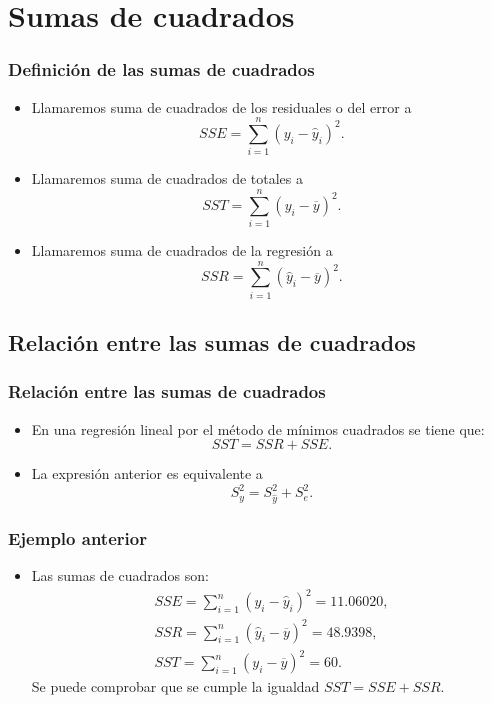 \section{Sumas de cuadrados}
\begin{frame}
\frametitle{Definición de las sumas de cuadrados}

\begin{itemize}
\item<2->{Llamaremos suma de cuadrados de los residuales o del error a
$$SSE=\sum_{i=1}^n(y_i-\hat{y}_i)^2.$$ }
\item<3->{Llamaremos suma de
cuadrados de totales a $$SST =\sum_{i=1}^n(y_i-\overline{y})^2.$$}
\item<4->{Llamaremos suma de cuadrados de la regresión a
$$SSR=\sum_{i=1}^n(\hat{y}_i-\overline{y})^2.$$}
\end{itemize}
\end{frame}

\subsection{Relación entre las sumas de cuadrados}
\begin{frame}
\frametitle{Relación entre las sumas de cuadrados}

\begin{itemize}
\item<2->{En una regresión lineal por el método de mínimos cuadrados se tiene que:
$$SST=SSR+SSE.$$}
\item<3->{La expresión anterior es equivalente a
$$S^2_y=S^2_{\hat{y}}+S^2_e.$$}
\end{itemize}
\end{frame}

\begin{frame}
\frametitle{Ejemplo anterior}
\begin{itemize}
\item<2->{Las sumas de cuadrados son:
$$
\begin{array}{l}
SSE=\sum_{i=1}^n(y_i-\hat{y}_i)^2 =11.06020,\\ SSR=\sum_{i=1}^n(\hat{y}_i-\overline{y})^2 =48.9398,\\
SST =\sum_{i=1}^n(y_i-\overline{y})^2 = 60.
\end{array}
$$
Se puede comprobar que se cumple la igualdad $SST=SSE+SSR$.
}
\end{itemize}
\end{frame}

